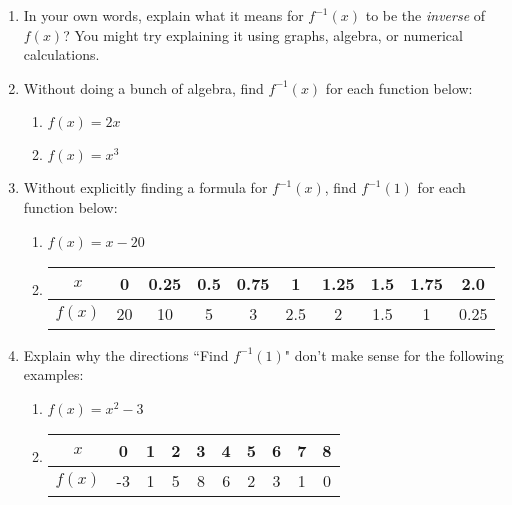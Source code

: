 \documentclass[11pt,fleqn]{article}
\begin{document}
\renewcommand{\headrulewidth}{0pt}
\newcommand{\blank}[1]{\rule{#1}{0.75pt}}
\renewcommand{\d}{\displaystyle}


\vspace*{-0.7in}
\begin{center}
  \large {}
\end{center}
\begin{enumerate}
\item In your own words, explain what it means for $f^{-1}(x)$  to be the \emph{inverse} of $f(x)$? You might try explaining it using graphs, algebra, or numerical calculations.
\vfill
\item Without doing a bunch of algebra, find $f^{-1}(x)$ for each function below:
\begin{multicols}{2}
\begin{enumerate}
	\item $f(x)=2x$
	\item $f(x)= x^3$
	\end{enumerate}
	\end{multicols}
	\vfill
\item Without explicitly finding a formula for $f^{-1}(x)$, find $f^{-1}(1)$ for each function below:\\
\begin{multicols}{3}
\begin{enumerate}
	\item $f(x)=x-20$
	\item \begin{tabular}{|c||c|c|c|c|c|c|c|c|c|}
$x$&0&0.25&0.5&0.75&1&1.25&1.5&1.75&2.0\\
\hline
$f(x)$&20&10&5&3&2.5&2&1.5&1&0.25\\
\end{tabular}

	\end{enumerate}
	\end{multicols}
	\vfill
\item Explain why the directions ``Find $f^{-1}(1)$" don't make sense for the following examples:

\begin{multicols}{3}
\begin{enumerate}
	\item $f(x)=x^2-3$
	\item \begin{tabular}{|c||c|c|c|c|c|c|c|c|c|}
$x$&0&1&2&3&4&5&6&7&8\\
\hline
$f(x)$&-3&1&5&8&6&2&3&1&0\\
\end{tabular}


\end{enumerate}
\end{multicols}
\end{enumerate}
\end{document}
